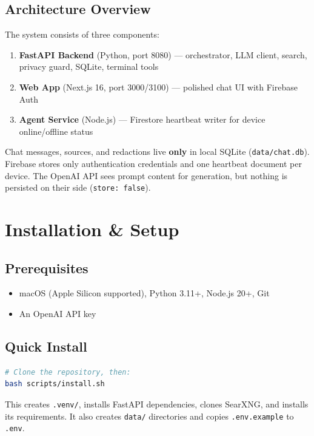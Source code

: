 \documentclass[a4paper,11pt,twoside]{report}
\begin{document}
\section{Architecture Overview}
The system consists of three components:

\begin{enumerate}
  \item \textbf{FastAPI Backend} (Python, port 8080) --- orchestrator, LLM client, search, privacy guard, SQLite, terminal tools
  \item \textbf{Web App} (Next.js 16, port 3000/3100) --- polished chat UI with Firebase Auth
  \item \textbf{Agent Service} (Node.js) --- Firestore heartbeat writer for device online/offline status
\end{enumerate}

\begin{infobox}
Chat messages, sources, and redactions live \textbf{only} in local SQLite (\texttt{data/chat.db}). Firebase stores only authentication credentials and one heartbeat document per device. The OpenAI API sees prompt content for generation, but nothing is persisted on their side (\texttt{store: false}).
\end{infobox}

\chapter{Installation \& Setup}

\section{Prerequisites}
\begin{itemize}
  \item macOS (Apple Silicon supported), Python 3.11+, Node.js 20+, Git
  \item An OpenAI API key
\end{itemize}

\section{Quick Install}
\begin{lstlisting}[language=bash]
# Clone the repository, then:
bash scripts/install.sh
\end{lstlisting}
This creates \texttt{.venv/}, installs FastAPI dependencies, clones SearXNG, and installs its requirements. It also creates \texttt{data/} directories and copies \texttt{.env.example} to \texttt{.env}.
\end{document}
